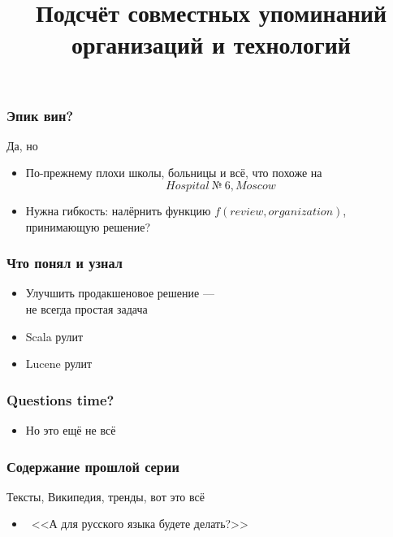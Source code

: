 \documentclass{beamer}
\begin{document}
\begin{frame}\frametitle{Эпик вин?}
Да, но
\begin{itemize}
    \item По-прежнему плохи школы, больницы и всё, что похоже на $$Hospital~№~6, Moscow$$
    \item Нужна гибкость: налёрнить функцию $f(review, organization)$, принимающую решение?
\end{itemize}
\end{frame}

\begin{frame}\frametitle{Что понял и узнал}
\begin{itemize}
    \item Улучшить продакшеновое решение --- \\не всегда простая задача
    \item Scala рулит
    \item Lucene рулит
\end{itemize}
\end{frame}

\begin{frame}\frametitle{Questions time?}
\begin{itemize}
	\item<2> Но это ещё не всё
\end{itemize}
\end{frame}


{
\title{Подсчёт совместных упоминаний организаций и технологий}
\frame{\titlepage}
}

\begin{frame}\frametitle{Содержание прошлой серии}
Тексты, Википедия, тренды, вот это всё
\begin{figure}[ht]
\begin{center}
\end{center}
\end{figure}
	\begin{itemize}
		\item ~<<А для русского языка будете делать?>>
	\end{itemize}
\end{frame}
\end{document}
